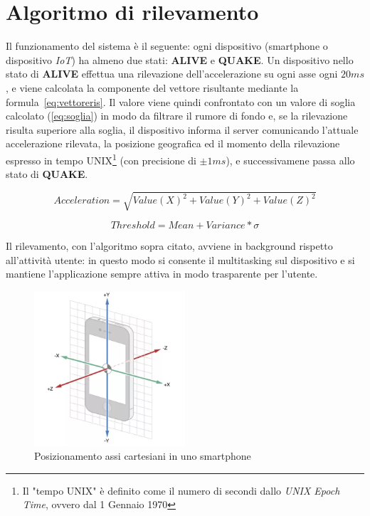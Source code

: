 \documentclass[a4paper,10pt]{memoir}
\begin{document}
\section{Algoritmo di rilevamento}
\label{section:algoritmo}

Il funzionamento del sistema è il seguente: ogni dispositivo (smartphone o dispositivo \textit{IoT}) ha almeno due stati: \textbf{ALIVE} e \textbf{QUAKE}. Un dispositivo nello stato di \textbf{ALIVE} effettua una rilevazione dell'accelerazione su ogni asse ogni $20ms$, e viene calcolata la componente del vettore risultante mediante la formula~\ref{eq:vettoreris}. Il valore viene quindi confrontato con un valore di soglia calcolato (\ref{eq:soglia}) in modo da filtrare il rumore di fondo e, se la rilevazione risulta superiore alla soglia, il dispositivo informa il server comunicando l'attuale accelerazione rilevata, la posizione geografica ed il momento della rilevazione espresso in tempo UNIX\footnote{Il "tempo UNIX" è definito come il numero di secondi dallo \textit{UNIX Epoch Time}, ovvero dal 1 Gennaio 1970} (con precisione di $\pm1ms$), e successivamene passa allo stato di \textbf{QUAKE}.

\begin{equation} \label{eq:vettoreris}
Acceleration = \sqrt{Value(X)^2 + Value(Y)^2 + Value(Z)^2}
\end{equation}

\begin{equation} \label{eq:soglia}
Threshold = Mean + Variance * \sigma
\end{equation}

Il rilevamento, con l'algoritmo sopra citato, avviene in background rispetto all'attività utente: in questo modo si consente il multitasking sul dispositivo e si mantiene l'applicazione sempre attiva in modo trasparente per l'utente.

\begin{figure}[ht]
\centering
\caption{Posizionamento assi cartesiani in uno smartphone}
\label{fig:scsaxes}
\includegraphics[width=0.5\textwidth]{introduzione/smartphone_axes}
\end{figure}
\end{document}
